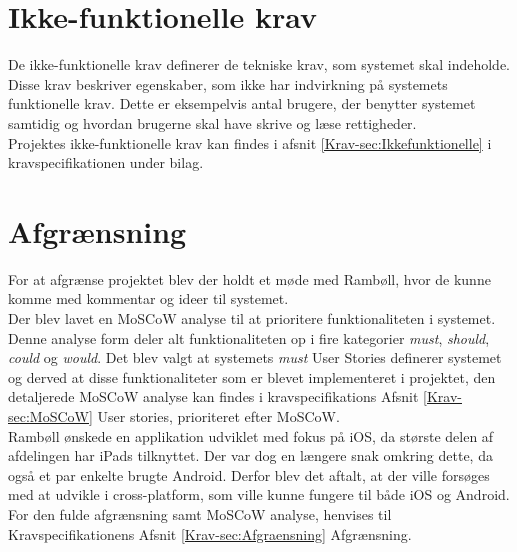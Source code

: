 \section{Ikke-funktionelle krav}
De ikke-funktionelle krav definerer de tekniske krav, som systemet skal indeholde. Disse krav beskriver egenskaber, som ikke har indvirkning på systemets funktionelle krav. Dette er eksempelvis antal brugere, der benytter systemet samtidig og hvordan brugerne skal have skrive og læse rettigheder. \\
Projektes ikke-funktionelle krav kan findes i afsnit \ref{Krav-sec:Ikkefunktionelle} i kravspecifikationen under bilag. \\

\section{Afgrænsning}
For at afgrænse projektet blev der holdt et møde med Rambøll, hvor de kunne komme med kommentar og ideer til systemet. \\
Der blev lavet en MoSCoW analyse til at prioritere funktionaliteten i systemet. Denne analyse form deler alt funktionaliteten op i fire kategorier \emph{must}, \emph{should}, \emph{could} og \emph{would}.
Det blev valgt at systemets \emph{must} User Stories definerer systemet og derved at disse funktionaliteter som er blevet implementeret i projektet, den detaljerede MoSCoW analyse kan findes i kravspecifikations Afsnit \ref{Krav-sec:MoSCoW} User stories, prioriteret efter MoSCoW. \\
Rambøll ønskede en applikation udviklet med fokus på iOS, da største delen af afdelingen har iPads tilknyttet. Der var dog en længere snak omkring dette, da også et par enkelte brugte Android. Derfor blev det aftalt, at der ville forsøges med at udvikle i cross-platform, som ville kunne fungere til både iOS og Android.
For den fulde afgrænsning samt MoSCoW analyse, henvises til Kravspecifikationens Afsnit \ref{Krav-sec:Afgraensning} Afgrænsning.
	